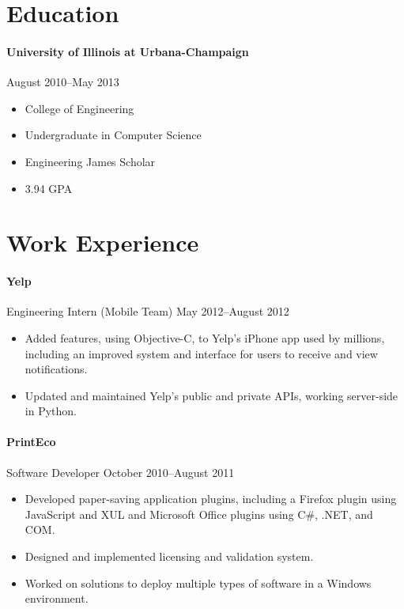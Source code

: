 \documentclass[letterpaper,12pt]{article}
\begin{document}
\section*{Education}
\paragraph{University of Illinois at Urbana-Champaign}
\hfill August 2010--May 2013
\begin{multicols}{2}
\begin{itemize}
\item College of Engineering
\item Undergraduate in Computer Science
\item Engineering James Scholar
\item 3.94 GPA
\end{itemize}
\end{multicols}

\section*{Work Experience}
\paragraph{Yelp}
Engineering Intern (Mobile Team) \hfill May 2012--August 2012
\begin{itemize}
\item Added features, using Objective-C,
to Yelp's iPhone app used by millions,
including an improved system and interface for users to
receive and view notifications.
\item Updated and maintained Yelp's public and private APIs,
working server-side in Python.
\end{itemize}

\paragraph{PrintEco}
Software Developer \hfill October 2010--August 2011
\begin{itemize}
\item Developed paper-saving application plugins,
including a Firefox plugin using JavaScript and XUL
and Microsoft Office plugins using C\#, .NET, and COM.
\item Designed and implemented licensing and validation system.
\item Worked on solutions to deploy multiple types of software
in a Windows environment.
\end{itemize}
\end{document}
